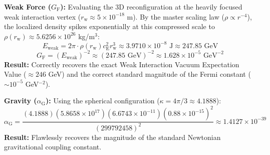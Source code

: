 \vspace{0.2em}
\noindent \textbf{Weak Force ($G_{\mathrm{F}}$):} Evaluating the 3D reconfiguration at the heavily focused weak interaction vertex ($r_{\mathrm{w}} \approx 5 \times 10^{-18}$ m). By the master scaling law ($\rho \propto r^{-4}$), the localized density spikes exponentially at this compressed scale to $\rho(r_{\mathrm{w}}) \approx 5.6256 \times 10^{26}$ kg/m$^3$:
\begin{equation}
    E_{\mathrm{weak}} = 2\pi \cdot \rho(r_{\mathrm{w}}) c_{\mathrm{E}}^2 r_{\mathrm{w}}^3 \approx 3.9710 \times 10^{-8} \text{ J} \approx 247.85 \text{ GeV}
\end{equation}
\begin{equation}
    G_{\mathrm{F}} = (E_{\mathrm{weak}})^{-2} \approx (247.85 \text{ GeV})^{-2} \approx 1.628 \times 10^{-5} \text{ GeV}^{-2}
\end{equation}
\noindent \textbf{Result:} Correctly recovers the exact Weak Interaction Vacuum Expectation Value ($\approx 246$ GeV) and the correct standard magnitude of the Fermi constant ($\sim 10^{-5}$ GeV$^{-2}$).

\vspace{0.2em}
\noindent \textbf{Gravity ($\alpha_{\mathrm{G}}$):} Using the spherical configuration ($\kappa = 4\pi/3 \approx 4.1888$):
\begin{equation}
    \alpha_{\mathrm{G}} = \frac{(4.1888)(5.8658 \times 10^{17})(6.6743 \times 10^{-11})(0.88 \times 10^{-15})^2}{(299792458)^2} \approx 1.4127 \times 10^{-39}
\end{equation}
\noindent \textbf{Result:} Flawlessly recovers the magnitude of the standard Newtonian gravitational coupling constant.